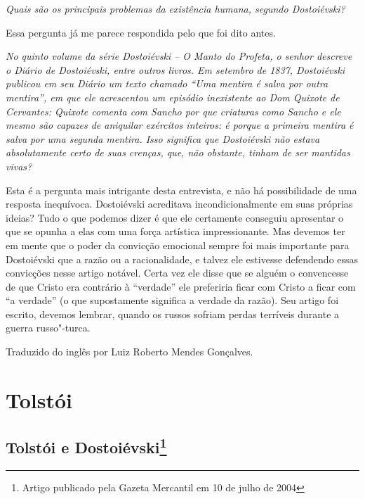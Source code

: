 \medskip

\emph{Quais são os principais problemas da existência humana, segundo
Dostoiévski?}

Essa pergunta já me parece respondida pelo que foi dito antes.

\medskip

\emph{No quinto volume da série \emph{Dostoiévski -- O Manto do Profeta}, o
senhor descreve o \emph{Diário} de Dostoiévski, entre outros livros.
Em setembro de 1837, Dostoiévski publicou em seu \emph{Diário} um texto
chamado ``Uma mentira é salva por outra mentira'', em que ele acrescentou
um episódio inexistente ao \emph{Dom Quixote} de Cervantes: Quixote comenta
com Sancho por que criaturas como Sancho e ele mesmo são capazes de aniquilar exércitos
inteiros: é porque a primeira mentira é salva por uma segunda mentira.
Isso significa que Dostoiévski não estava absolutamente certo de suas
crenças, que, não obstante, tinham de ser mantidas vivas?}

Esta é a pergunta mais intrigante desta entrevista, e não há
possibilidade de uma resposta inequívoca. Dostoiévski acreditava
incondicionalmente em suas próprias ideias? Tudo o que podemos dizer é
que ele certamente conseguiu apresentar o que se opunha a elas com uma
força artística impressionante. Mas devemos ter em mente que o poder da
convicção emocional sempre foi mais importante para Dostoiévski que a
razão ou a racionalidade, e talvez ele estivesse defendendo essas
convicções nesse artigo notável. Certa vez ele disse que se alguém o
convencesse de que Cristo era contrário à ``verdade'' ele preferiria ficar
com Cristo a ficar com ``a verdade'' (o que supostamente significa a
verdade da razão). Seu artigo foi escrito, devemos lembrar, quando os
russos sofriam perdas terríveis durante a guerra russo"-turca.

\medskip

\noindent
Traduzido do inglês por Luiz Roberto Mendes Gonçalves.



\part{Tolstói}

\chapter{Tolstói e Dostoiévski\footnote{Artigo publicado pela Gazeta
  Mercantil em 10 de julho de 2004}}


